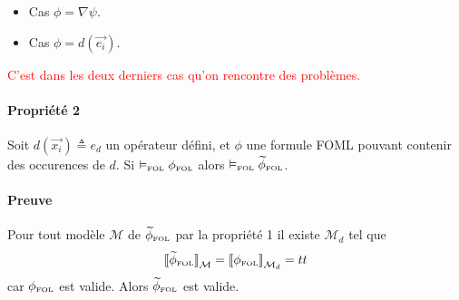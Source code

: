 \documentclass[12pt]{article}
\newcommand{\FOL}{\ensuremath{\textup{\tiny{}FOL}}}
\newcommand{\raph}[1]{\textcolor{red}{#1}}
\begin{document}
\begin{itemize}
\item
  Cas $\phi = \nabla \psi$.
\item
  Cas $\phi = d(\vec{e_i})$.
\end{itemize}

\raph{%
  C'est dans les deux derniers cas qu'on rencontre des problèmes.}



\paragraph{Propriété 2}
Soit $d(\vec{x_i}) \triangleq e_d$ un opérateur défini, et $\phi$ une formule FOML pouvant contenir des occurences de $d$.
Si $\vDash_\FOL \phi_\FOL$ alors $\vDash_\FOL \widetilde{\phi}_\FOL$.

\paragraph{Preuve}
Pour tout modèle $\mathcal{M}$ de $\widetilde{\phi}_\FOL$ par la propriété 1 il existe $\mathcal{M}_d$ tel que
\[
  {\llbracket \widetilde{\phi}_\FOL \rrbracket}_{\mathcal{M}} = {\llbracket \phi_\FOL \rrbracket}_{\mathcal{M}_d} = tt
\]
car $\phi_\FOL$ est valide. Alors $\widetilde{\phi}_\FOL$ est valide.
\end{document}
